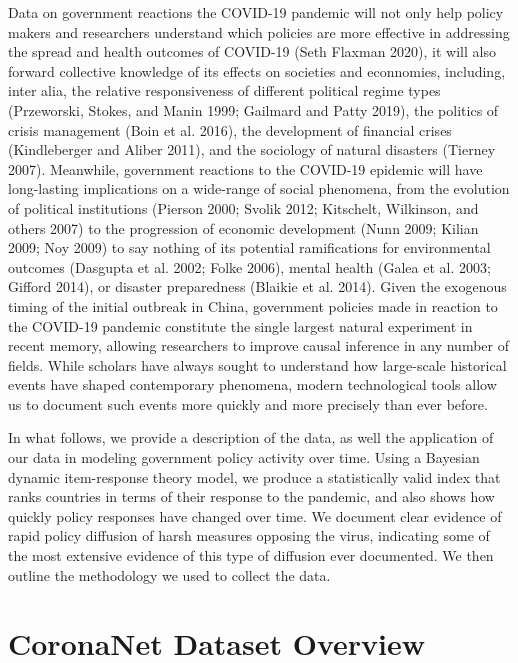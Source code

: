 \documentclass[]{article}
\begin{document}
Data on government reactions the COVID-19 pandemic will not only help policy makers and researchers understand which policies are more effective in addressing the spread and health outcomes of COVID-19 (Seth Flaxman 2020), it will also forward collective knowledge of its effects on societies and econnomies, including, inter alia, the relative responsiveness of different political regime types (Przeworski, Stokes, and Manin 1999; Gailmard and Patty 2019), the politics of crisis management (Boin et al. 2016), the development of financial crises (Kindleberger and Aliber 2011), and the sociology of natural disasters (Tierney 2007). Meanwhile, government reactions to the COVID-19 epidemic will have long-lasting implications on a wide-range of social phenomena, from the evolution of political institutions (Pierson 2000; Svolik 2012; Kitschelt, Wilkinson, and others 2007) to the progression of economic development (Nunn 2009; Kilian 2009; Noy 2009) to say nothing of its potential ramifications for environmental outcomes (Dasgupta et al. 2002; Folke 2006), mental health (Galea et al. 2003; Gifford 2014), or disaster preparedness (Blaikie et al. 2014). Given the exogenous timing of the initial outbreak in China, government policies made in reaction to the COVID-19 pandemic constitute the single largest natural experiment in recent memory, allowing researchers to improve causal inference in any number of fields. While scholars have always sought to understand how large-scale historical events have shaped contemporary phenomena, modern technological tools allow us to document such events more quickly and more precisely than ever before.

In what follows, we provide a description of the data, as well the application of our data in modeling government policy activity over time. Using a Bayesian dynamic item-response theory model, we produce a statistically valid index that ranks countries in terms of their response to the pandemic, and also shows how quickly policy responses have changed over time. We document clear evidence of rapid policy diffusion of harsh measures opposing the virus, indicating some of the most extensive evidence of this type of diffusion ever documented. We then outline the methodology we used to collect the data.

\hypertarget{coronanet-dataset-overview}{%
\section{CoronaNet Dataset Overview}\label{coronanet-dataset-overview}}
\end{document}
